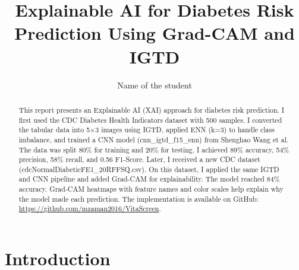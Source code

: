 \documentclass[12pt]{dalthesis}
\begin{document}
\title{Explainable AI for Diabetes Risk Prediction Using Grad-CAM and IGTD}
\author{Name of the student}

\macs  
{}


\makenomenclature
\renewcommand{\nomname}{List of Abbreviations and Symbols Used}


\frontmatter

\begin{abstract}
This report presents an Explainable AI (XAI) approach for diabetes risk prediction. I first used the CDC Diabetes Health Indicators dataset with 500 samples. I converted the tabular data into 5$\times$3 images using IGTD, applied ENN (k=3) to handle class imbalance, and trained a CNN model (cnn\_igtd\_f15\_enn) from Shenghao Wang et al. The data was split 80\% for training and 20\% for testing. I achieved 89\% accuracy, 54\% precision, 58\% recall, and 0.56 F1-Score. Later, I received a new CDC dataset (cdcNormalDiabeticFE1\_20RFFSQ.csv). On this dataset, I applied the same IGTD and CNN pipeline and added Grad-CAM for explainability. The model reached 84\% accuracy. Grad-CAM heatmaps with feature names and color scales help explain why the model made each prediction. The implementation is available on GitHub: \url{https://github.com/mzaman2016/VitaScreen}.
\end{abstract}

\printnomenclature

\listoffigures

\begin{acknowledgements}
\end{acknowledgements}

\mainmatter

\chapter{Introduction}
\end{document}
